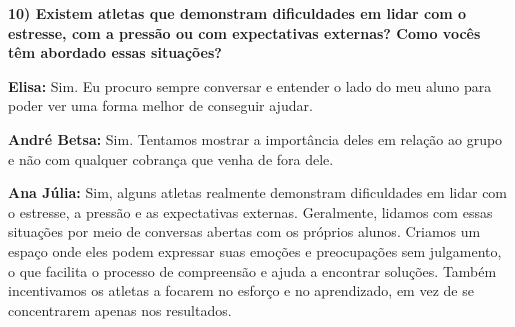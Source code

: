 \textbf{10) Existem atletas que demonstram dificuldades em lidar com o estresse, com a pressão ou com expectativas externas? Como vocês têm abordado essas situações?}

\textbf{Elisa:} Sim. Eu procuro sempre conversar e entender o lado do meu aluno para poder ver uma forma melhor de conseguir ajudar.

\textbf{André Betsa:} Sim. Tentamos mostrar a importância deles em relação ao grupo e não com qualquer cobrança que venha de fora dele.

\textbf{Ana Júlia:} Sim, alguns atletas realmente demonstram dificuldades em lidar com o estresse, a pressão e as expectativas externas. Geralmente, lidamos com essas situações por meio de conversas abertas com os próprios alunos. Criamos um espaço onde eles podem expressar suas emoções e preocupações sem julgamento, o que facilita o processo de compreensão e ajuda a encontrar soluções. Também incentivamos os atletas a focarem no esforço e no aprendizado, em vez de se concentrarem apenas nos resultados.
